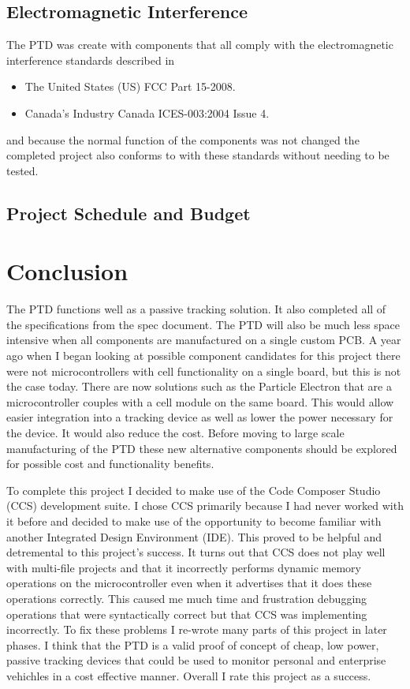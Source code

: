 \documentclass[11pt]{article}
\begin{document}
\subsection{Electromagnetic Interference}
The PTD was create with components that all comply with the electromagnetic interference standards described in 
\begin{itemize}
    \item The United States (US) FCC Part 15-2008.
    \item Canada's Industry Canada ICES-003:2004 Issue 4.
\end{itemize}
and because the normal function of the components was not changed the completed project also conforms to with these standards without needing to be tested.

\subsection{Project Schedule and Budget}


\section{Conclusion}
The PTD functions well as a passive tracking solution. It also completed all of the specifications from the spec document. The PTD will also be much less space intensive when all components are manufactured on a single
custom PCB. A year ago when I began looking at possible component candidates for this project there were not microcontrollers with cell functionality on a single board, but this is not the case today. 
There are now solutions such as the Particle Electron that are a microcontroller couples with a cell module on the same board. This would allow easier integration into a tracking device as well as lower
the power necessary for the device. It would also reduce the cost. Before moving to large scale  manufacturing of the PTD these new alternative components should be explored for possible cost and functionality
benefits.

To complete this project I decided to make use of the Code Composer Studio (CCS) development suite. I chose CCS primarily because I had never worked with it before and decided to make use of the opportunity 
to become familiar with another Integrated Design Environment (IDE). This proved to be helpful and detremental to this project's success. It turns out that CCS does not play well with multi-file projects and
that it incorrectly performs dynamic memory operations on the microcontroller even when it advertises that it does these operations correctly. This caused me much time and frustration debugging operations that
were syntactically correct but that CCS was implementing incorrectly. To fix these problems I re-wrote many parts of this project in later phases. I think that the PTD is a valid proof of concept of cheap, low 
power, passive tracking devices that could be used to monitor personal and enterprise vehichles in a cost effective manner. Overall I rate this project as a success.   
\end{document}

